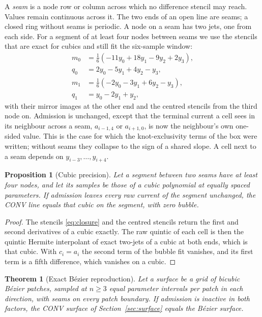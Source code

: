 \documentclass[journal]{IEEEtran}
\newtheorem{theorem}{Theorem}
\newtheorem{proposition}{Proposition}
\begin{document}
A \emph{seam} is a node row or column across which no difference stencil
may reach. Values remain continuous across it. The two ends of an open
line are seams; a closed ring without seams is periodic. A node on a seam
has two jets, one from each side. For a segment of at least four nodes
between seams we use the stencils that are exact for cubics and still fit
the six-sample window:
\begin{align}
 m_0&=\tfrac16(-11y_0+18y_1-9y_2+2y_3),\nonumber\\
 q_0&=2y_0-5y_1+4y_2-y_3,\nonumber\\
 m_1&=\tfrac16(-2y_0-3y_1+6y_2-y_3),\label{eq:closure}\\
 q_1&=y_0-2y_1+y_2,\nonumber
\end{align}
with their mirror images at the other end and the centred stencils from
the third node on. Admission is unchanged, except that the terminal
current a cell sees in its neighbour across a seam, $a_{i-1,4}$ or
$a_{i+1,0}$, is now the neighbour's own one-sided value. This is the case
for which the knot-exclusivity terms of the box were written; without
seams they collapse to the sign of a shared slope. A cell next to a seam
depends on $y_{i-3},\ldots,y_{i+4}$.

\begin{proposition}[Cubic precision]
\label{prop:cubic}
Let a segment between two seams have at least four nodes, and let its
samples be those of a cubic polynomial at equally spaced parameters. If
admission leaves every raw current of the segment unchanged, the CONV
line equals that cubic on the segment, with zero bubble.
\end{proposition}

\begin{proof}
The stencils \eqref{eq:closure} and the centred stencils return the first
and second derivatives of a cubic exactly. The raw quintic of each cell
is then the quintic Hermite interpolant of exact two-jets of a cubic at
both ends, which is that cubic. With $c_i=a_i$ the second term of the
bubble fit vanishes, and its first term is a fifth difference, which
vanishes on a cubic.
\end{proof}

\begin{theorem}[Exact B\'ezier reproduction]
\label{thm:exact}
Let a surface be a grid of bicubic B\'ezier patches, sampled at $n\ge3$
equal parameter intervals per patch in each direction, with seams on
every patch boundary. If admission is inactive in both factors, the CONV
surface of Section~\ref{sec:surface} equals the B\'ezier surface.
\end{theorem}
\end{document}
